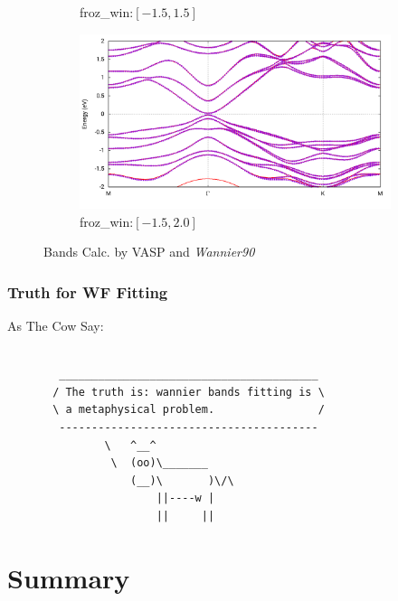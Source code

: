 \documentclass{beamer}
\begin{document}
\begin{frame}
\begin{figure}
\begin{subfigure}{0.42\textwidth}
         \caption{{\small froz\_win:\([-1.5,1.5]\)}}
      \end{subfigure}
      \begin{subfigure}{0.42\textwidth}
         \centering
         \includegraphics[width=\textwidth]{figure/Band_-1-5_to_2-0.png}
         \caption{{\small froz\_win:\([-1.5,2.0]\)}}
      \end{subfigure}
        \caption{Bands Calc. by VASP and \emph{Wannier90}}
    \end{figure}

  \end{frame}

  \begin{frame}[fragile]
    \frametitle{Truth for WF Fitting}
    \begin{block}{As The Cow Say:}
      \begin{verbatim}

        ________________________________________
       / The truth is: wannier bands fitting is \
       \ a metaphysical problem.                /
        ----------------------------------------
               \   ^__^
                \  (oo)\_______
                   (__)\       )\/\
                       ||----w |
                       ||     ||
     \end{verbatim}
    \end{block}
  \end{frame}

  \section{Summary}
\end{document}
